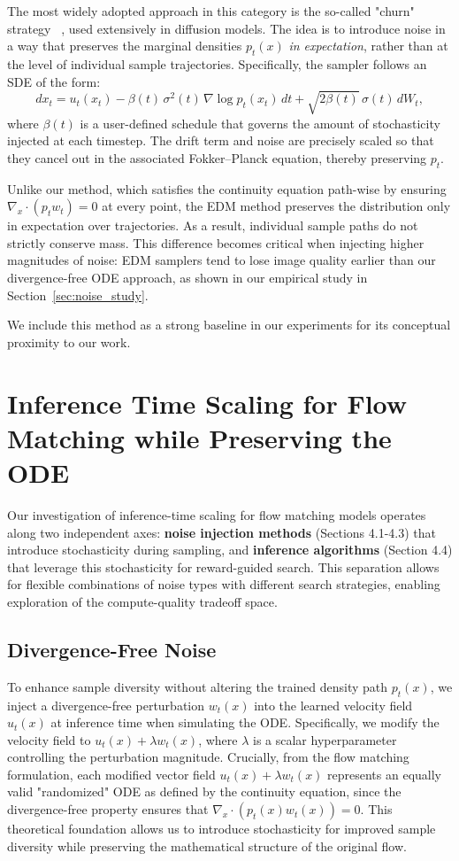 \documentclass{article}
\begin{document}
The most widely adopted approach in this category is the so-called "churn" strategy ~\cite{karras2022elucidatingdesignspacediffusionbased}, used extensively in diffusion models. The idea is to introduce noise in a way that preserves the marginal densities \(p_t(x)\) \emph{in expectation}, rather than at the level of individual sample trajectories. Specifically, the sampler follows an SDE of the form:
\[
d x_t = u_t(x_t) - \beta(t)\,\sigma^2(t)\,\nabla \log p_t(x_t)\,dt + \sqrt{2\beta(t)}\,\sigma(t)\,dW_t,
\]
where \(\beta(t)\) is a user-defined schedule that governs the amount of stochasticity injected at each timestep. The drift term and noise are precisely scaled so that they cancel out in the associated Fokker–Planck equation, thereby preserving \(p_t\).

Unlike our method, which satisfies the continuity equation path-wise by ensuring \(\nabla_x\!\cdot(p_t w_t)=0\) at every point, the EDM method preserves the distribution only in expectation over trajectories. As a result, individual sample paths do not strictly conserve mass. This difference becomes critical when injecting higher magnitudes of noise: EDM samplers tend to lose image quality earlier than our divergence-free ODE approach, as shown in our empirical study in Section~\ref{sec:noise_study}.

We include this method as a strong baseline in our experiments for its conceptual proximity to our work.

\section{Inference Time Scaling for Flow Matching while Preserving the ODE}

Our investigation of inference-time scaling for flow matching models operates along two independent axes: \textbf{noise injection methods} (Sections 4.1-4.3) that introduce stochasticity during sampling, and \textbf{inference algorithms} (Section 4.4) that leverage this stochasticity for reward-guided search. This separation allows for flexible combinations of noise types with different search strategies, enabling exploration of the compute-quality tradeoff space.

\subsection{Divergence-Free Noise}

To enhance sample diversity without altering the trained density path \(p_t(x)\), we inject a divergence-free perturbation \(w_t(x)\) into the learned velocity field \(u_t(x)\) at inference time when simulating the ODE. Specifically, we modify the velocity field to \(u_t(x) + \lambda w_t(x)\), where \(\lambda\) is a scalar hyperparameter controlling the perturbation magnitude. Crucially, from the flow matching formulation, each modified vector field \(u_t(x) + \lambda w_t(x)\) represents an equally valid "randomized" ODE as defined by the continuity equation, since the divergence-free property ensures that \(\nabla_x \cdot (p_t(x) w_t(x)) = 0\). This theoretical foundation allows us to introduce stochasticity for improved sample diversity while preserving the mathematical structure of the original flow.
\end{document}
